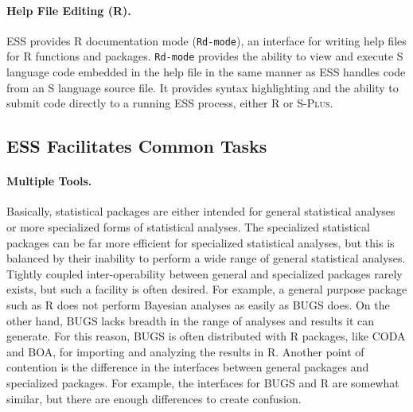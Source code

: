 \documentclass{article}
\newcommand*{\Splus}{\textsc{S-Plus}}
\newcommand{\stexttt}[1]{{\small\texttt{#1}}}
\begin{document}
\paragraph{Help File Editing (R).}
ESS provides R documentation mode (\stexttt{Rd-mode}), an interface
for writing help files for R functions and packages.
\stexttt{Rd-mode} provides the ability to view and execute S language
code embedded in the help file in the same manner as ESS handles code
from an S language source file.  It provides syntax highlighting and
the ability to submit code directly to a running ESS process, either R or
\Splus.


\subsection{ESS Facilitates Common Tasks}
\label{sec:ess-facil-comm}

\paragraph{Multiple Tools.}
\label{sec:multiple-tools}

Basically, statistical packages are either intended for general
statistical analyses or more specialized forms of statistical analyses.
The specialized statistical packages can be far more efficient for
specialized statistical analyses, but this is balanced by their inability
to perform a wide range of general statistical analyses.  Tightly coupled
inter-operability between general and specialized packages rarely exists,
but such a facility is often desired.  For example, a general purpose
package such as R does not perform Bayesian analyses as easily as BUGS does.
On the other hand, BUGS lacks breadth in the range of analyses and results
it can generate.  For this reason, BUGS is often distributed with R packages,
like CODA and BOA, for importing and analyzing the results in R.  Another
point of contention is the difference in the interfaces between general
packages and specialized packages.  For example, the interfaces for BUGS
and R are somewhat similar, but there are enough differences to create confusion.
\end{document}
